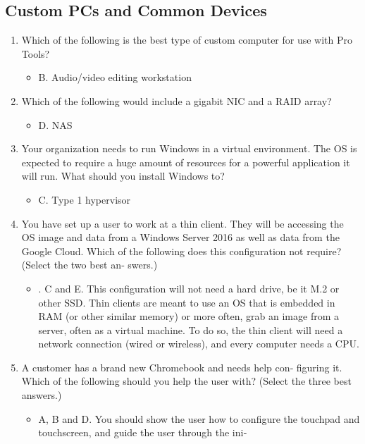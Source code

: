 \documentclass{article}
\begin{document}
\subsection{Custom PCs and
Common Devices}
\begin{enumerate}
    \item Which of the following is the best type of custom
computer for use with Pro Tools?
    \begin{itemize}
        \item B. Audio/video editing workstation
    \end{itemize}
    \item Which of the following would include a gigabit
NIC and a RAID array?
    \begin{itemize}
        \item D. NAS
    \end{itemize}
    \item Your organization needs to run Windows in a
virtual environment. The OS is expected to require
a huge amount of resources for a powerful
application it will run. What should you install
Windows to?
    \begin{itemize}
        \item C. Type 1 hypervisor
    \end{itemize}
    \item You have set up a user to work at a thin client. They will be
accessing the OS image and data from a Windows Server 2016
as well as data from the Google Cloud. Which of the following
does this configuration not require? (Select the two best an‐
swers.)
    \begin{itemize}
        \item . C and E. This configuration will not need a hard drive, be it
M.2 or other SSD. Thin clients are meant to use an OS that is
embedded in RAM (or other similar memory) or more often,
grab an image from a server, often as a virtual machine. To do
so, the thin client will need a network connection (wired or
wireless), and every computer needs a CPU.
    \end{itemize}
    \item A customer has a brand new Chromebook and needs help con‐
figuring it. Which of the following should you help the user
with? (Select the three best answers.)
    \begin{itemize}
        \item A, B and D. You should show the user how to configure the
touchpad and touchscreen, and guide the user through the ini‐

\end{itemize}
\end{enumerate}
\end{document}
